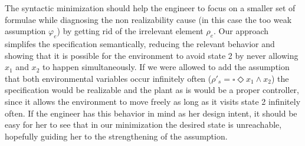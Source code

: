 The syntactic minimization should help the engineer to focus on a smaller set of formulae while diagnosing the non realizability cause (in this case the too weak assumption $\varphi_e$) by getting rid of the irrelevant element $\rho_e$. Our approach simplifes the specification semantically, reducing the relevant behavior and showing that it is possible for the environment to avoid state 2 by never allowing $x_1$ and $x_2$ to happen simultaneously. If we were allowed to add the assumption that both environmental variables occur infinitely often ($\rho'_s = \square \Diamond x_1 \wedge x_2$) the specification would be realizable and the plant as is would be a proper controller, since it allows the environment to move freely as long as it visits state 2 infinitely often. If the engineer has this behavior in mind as her design intent, it should be easy for her to see that in our minimization the desired state is unreachable, hopefully guiding her to the strengthening of the assumption.  

